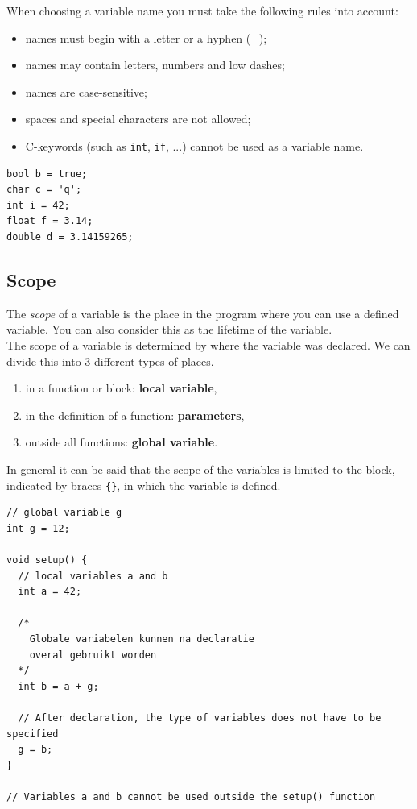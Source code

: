 \documentclass[11pt,fleqn]{book} %
\def\Cpp{{C\nolinebreak[4]\hspace{-.05em}\raisebox{.4ex}{\tiny\bf ++}}}
\begin{document}
\noindent  When choosing a variable name you must take the following rules into account:
\begin{itemize}
	\item names must begin with a letter or a hyphen (\_);
	\item names may contain letters, numbers and low dashes;
	\item names are case-sensitive;
	\item spaces and special characters are not allowed;
	\item \Cpp{}-keywords (such as \texttt{int}, \texttt{if}, ...) cannot be used as a variable name.
\end{itemize}

\begin{example}
	\phantom{ }
	\begin{verbatim}
bool b = true;
char c = 'q';
int i = 42;
float f = 3.14;
double d = 3.14159265;
	\end{verbatim}
\end{example}

\subsection{Scope}
The \emph{scope} of a variable is the place in the program where you can use a defined variable. You can also consider this as the lifetime of the variable.\\

\noindent
The scope of a variable is determined by where the variable was declared. We can divide this into 3 different types of places.

\begin{enumerate}
	\item in a function or block: \textbf{local variable},
	\item in the definition of a function: \textbf{parameters},
	\item outside all functions: \textbf{global variable}.
\end{enumerate}

\noindent
In general it can be said that the scope of the variables is limited to the block, indicated by braces \texttt {\{\}}, in which the variable is defined.

\begin{example}
	\phantom{ }
	\begin{verbatim}
// global variable g
int g = 12;

void setup() {
  // local variables a and b
  int a = 42;

  /*
    Globale variabelen kunnen na declaratie
    overal gebruikt worden
  */
  int b = a + g;

  // After declaration, the type of variables does not have to be specified
  g = b;
}

// Variables a and b cannot be used outside the setup() function

	\end{verbatim}
\end{example}
\end{document}
